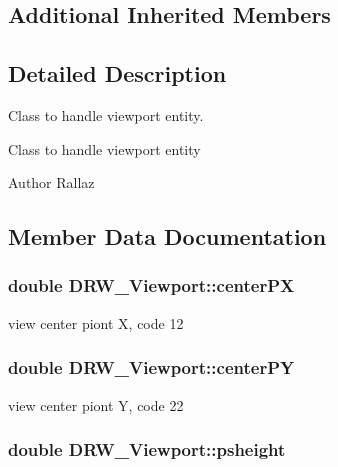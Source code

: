 \subsection*{Additional Inherited Members}


\subsection{Detailed Description}
Class to handle viewport entity. 

Class to handle viewport entity \begin{DoxyAuthor}{Author}
Rallaz 
\end{DoxyAuthor}


\subsection{Member Data Documentation}
\hypertarget{classDRW__Viewport_a345ae2f37484ce99a63b0a62444a80e9}{
\subsubsection[{center\-P\-X}]{\setlength{\rightskip}{0pt plus 5cm}double D\-R\-W\-\_\-\-Viewport\-::center\-P\-X}}\label{classDRW__Viewport_a345ae2f37484ce99a63b0a62444a80e9}
view center piont X, code 12 \hypertarget{classDRW__Viewport_aa40e5f6095ea9641c463c71f79bc7650}{
\subsubsection[{center\-P\-Y}]{\setlength{\rightskip}{0pt plus 5cm}double D\-R\-W\-\_\-\-Viewport\-::center\-P\-Y}}\label{classDRW__Viewport_aa40e5f6095ea9641c463c71f79bc7650}
view center piont Y, code 22 \hypertarget{classDRW__Viewport_af462ca77d7463df5319af366846b6494}{
\subsubsection[{psheight}]{\setlength{\rightskip}{0pt plus 5cm}double D\-R\-W\-\_\-\-Viewport\-::psheight}}\label{classDRW__Viewport_af462ca77d7463df5319af366846b6494}

